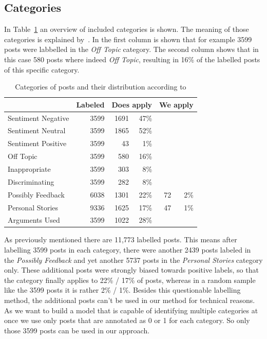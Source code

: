 \documentclass[11pt,a4paper]{article}
\begin{document}
\subsection{Categories}
In Table~\ref{tab:categories} an overview of included categories is shown. The meaning of those categories is explained by~.
In the first column is shown that for example 3599 posts were labbelled in the \textit{Off Topic} category. 
The second column shows that in this case 580 posts where indeed \textit{Off Topic}, resulting in 16\% of the labelled posts of this specific category. 

\begin{table}
	\centering\small
	\begin{tabular}{l r r r r r}
		& Labeled & \multicolumn{2}{c}{Does apply} & \multicolumn{2}{c}{We apply} \\
		\hline
		Sentiment Negative & 3599 & 1691 & 47\% \\
		Sentiment Neutral & 3599 & 1865 & 52\% \\
		Sentiment Positive & 3599 & 43 & 1\% \\
		Off Topic & 3599 & 580 & 16\% \\
		Inappropriate & 3599 & 303 & 8\%\\
		Discriminating & 3599 & 282 & 8\%\\
		Possibly Feedback & 6038 & 1301 & 22\% & 72 & 2\%\\
		Personal Stories & 9336 & 1625 & 17\% & 47 & 1\%\\
		Arguments Used & 3599 & 1022 & 28\%\\
	\end{tabular}
	\caption{Categories of posts and their distribution according to }
	\label{tab:categories}
\end{table}

As previously mentioned there are 11,773 labelled posts. This means after labelling 3599 posts in each category, there were another 2439 posts labeled in the \textit{Possibly Feedback} and yet another 5737 posts in the \textit{Personal Stories} category only.
These additional posts were strongly biased towards positive labels, so that the category finally applies to 22\% / 17\% of posts, whereas in a random sample like the 3599 posts it is rather 2\% / 1\%.
Besides this questionable labelling method, the additional posts can't be used in our method for technical reasons.
As we want to build a model that is capable of identifying multiple categories at once we use only posts that are annotated as 0 or 1 for each category.
So only those 3599 posts can be used in our approach.  
\end{document}
